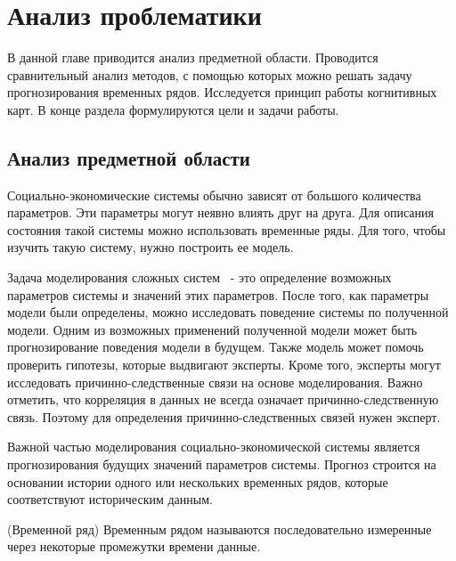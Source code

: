 

\chapter{Анализ проблематики }
\label{chapter1}

\begin{annotation}
	В данной главе приводится анализ предметной области.
	Проводится сравнительный анализ методов, с помощью которых
	можно решать задачу прогнозирования временных рядов.
	Исследуется принцип работы когнитивных карт.
	В конце раздела формулируются цели и задачи работы.
\end{annotation}


\section{Анализ предметной области}

Социально-экономические системы обычно зависят от большого количества параметров.
Эти параметры могут неявно влиять друг на друга. Для описания состояния такой системы
можно использовать временные ряды. Для того, чтобы изучить такую систему, нужно построить ее модель.

Задача моделирования сложных систем ~- это определение возможных параметров
системы и значений этих параметров. После того, как параметры модели были определены,
можно исследовать поведение системы по полученной модели. Одним из возможных
применений полученной модели может быть прогнозирование поведения модели в будущем.
Также модель может помочь проверить гипотезы, которые выдвигают эксперты.
Кроме того, эксперты могут исследовать причинно-следственные связи на основе моделирования.
Важно отметить, что корреляция в данных не всегда означает причинно-следственную связь.
Поэтому для определения причинно-следственных связей нужен эксперт.

Важной частью моделирования социально-экономической системы является
прогнозирования будущих значений параметров системы. Прогноз строится на основании
истории одного или нескольких временных рядов, которые соответствуют историческим данным.

\begin{definition}
	(Временной ряд)
	Временным рядом называются последовательно измеренные через некоторые промежутки времени данные.
\end{definition}

